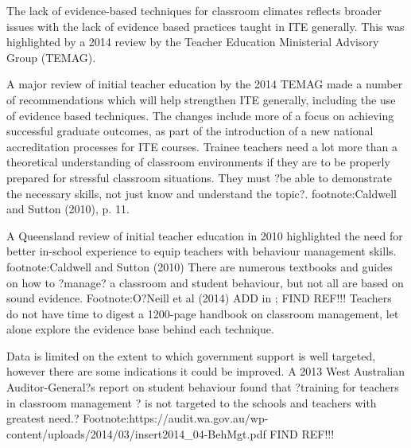 The lack of evidence-based techniques for classroom climates reflects broader issues with the lack of evidence based practices taught in ITE generally. This was highlighted by a 2014 review by the Teacher Education Ministerial Advisory Group (TEMAG). %

A major review of initial teacher education by the 2014 TEMAG made a number of recommendations which will help strengthen ITE generally, including the use of evidence based techniques. The changes include more of a focus on achieving successful graduate outcomes, as part of the introduction of a new national accreditation processes for ITE courses.  %
Trainee teachers need a lot more than a theoretical understanding of classroom environments if they are to be properly prepared for stressful classroom situations. They must ?be able to demonstrate the necessary skills, not just know and understand the topic?.  footnote:Caldwell and Sutton (2010), p. 11.

A Queensland review of initial teacher education in 2010 highlighted the need for better in-school experience to equip teachers with behaviour management skills. footnote:Caldwell and Sutton (2010)
There are numerous textbooks and guides on how to ?manage? a classroom and student behaviour, but not all are based on sound evidence. Footnote:O?Neill et al (2014) ADD in ; FIND REF!!!
Teachers do not have time to digest a 1200-page handbook on classroom management, let alone explore the evidence base behind each technique.

Data is limited on the extent to which government support is well targeted, however there are some indications it could be improved. A 2013 West Australian Auditor-General?s report on student behaviour found that ?training for teachers in classroom management ? is not targeted to the schools and teachers with greatest need.?  Footnote:https://audit.wa.gov.au/wp-content/uploads/2014/03/insert2014_04-BehMgt.pdf FIND REF!!!

